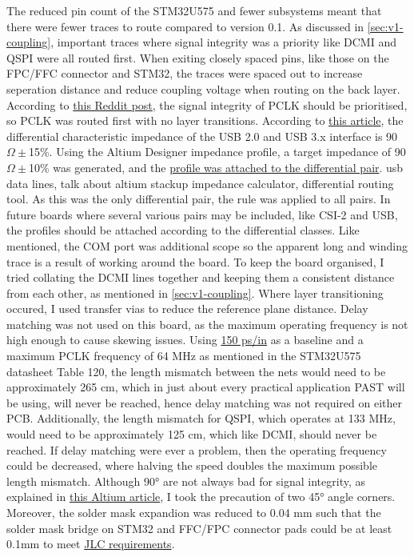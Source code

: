 The reduced pin count of the STM32U575 and fewer subsystems meant that there were fewer traces to route compared to version 0.1.
As discussed in \autoref{sec:v1-coupling}, important traces where signal integrity was a priority like DCMI and QSPI were all routed first.
When exiting closely spaced pins, like those on the FPC/FFC connector and STM32, the traces were spaced out to increase seperation distance and reduce coupling voltage when routing on the back layer.
According to \href{https://www.reddit.com/r/embedded/comments/1ozbddc/for_dcmi_pcb_routing_using_ov2640_camera_on_stm32/}{this Reddit post}, the signal integrity of PCLK should be prioritised, so PCLK was routed first with no layer transitions.
\nl
According to \href{https://resources.pcb.cadence.com/blog/2024-impedance-matching-for-usb-interfaces-in-pcbs}{this article}, the differential characteristic impedance of the USB 2.0 and USB 3.x interface is 90$\Omega \pm$15\%.
Using the Altium Designer impedance profile, a target impedance of 90$\Omega \pm$10\% was generated, and the \href{https://www.youtube.com/watch?v=C-BBZG2tuKA}{profile was attached to the differential pair}.
usb data lines, talk about altium stackup impedance calculator, differential routing tool.
As this was the only differential pair, the rule was applied to all pairs. In future boards where several various pairs may be included, like CSI-2 and USB, the profiles should be attached according to the differential classes.
Like mentioned, the COM port was additional scope so the apparent long and winding trace is a result of working around the board.
\nl
To keep the board organised, I tried collating the DCMI lines together and keeping them a consistent distance from each other, as mentioned in \autoref{sec:v1-coupling}.
Where layer transitioning occured, I used transfer vias to reduce the reference plane distance.
\nl
Delay matching was not used on this board, as the maximum operating frequency is not high enough to cause skewing issues.
Using \href{https://blindburiedcircuits.com/why-signal-propagation-delay-matters-in-pcb-design/}{150 ps/in} as a baseline and a maximum PCLK frequency of 64 MHz as mentioned in the STM32U575 datasheet Table 120, the length mismatch between the nets would need to be approximately 265 cm, which in just about every practical application PAST will be using, will never be reached, hence delay matching was not required on either PCB.
Additionally, the length mismatch for QSPI, which operates at 133 MHz, would need to be approximately 125 cm, which like DCMI, should never be reached.
If delay matching were ever a problem, then the operating frequency could be decreased, where halving the speed doubles the maximum possible length mismatch.
\nl
Although 90° are not always bad for signal integrity, as explained in \href{https://resources.altium.com/p/pcb-routing-angle-myths-45-degree-angle-versus-90-degree-angle}{this Altium article}, I took the precaution of two 45° angle corners.
\nl
Moreover, the solder mask expandion was reduced to 0.04 mm such that the solder mask bridge on STM32 and FFC/FPC connector pads could be at least 0.1mm to meet \href{https://jlcpcb.com/capabilities/pcb-capabilities}{JLC requirements}.